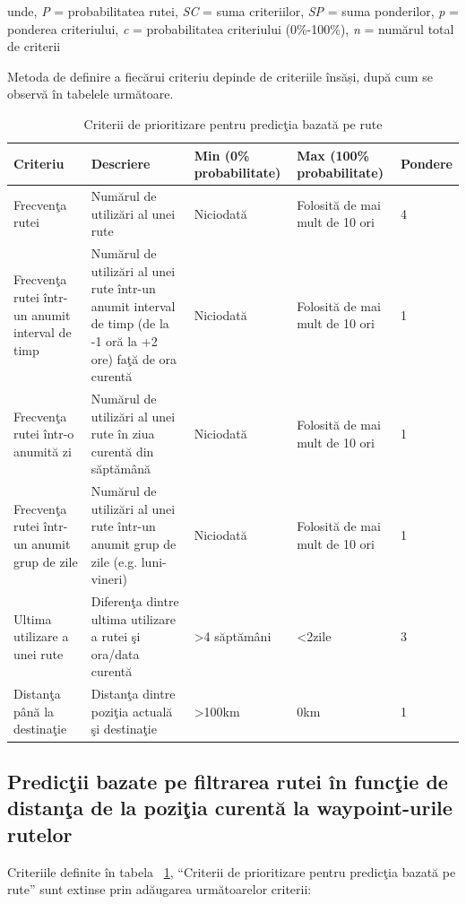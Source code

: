 		unde, \textit{P} = probabilitatea rutei, \textit{SC} = suma criteriilor, \textit{SP} = suma ponderilor, \textit{p} = ponderea criteriului, \textit{c} = probabilitatea criteriului (0\%-100\%), \textit{n} = numărul total de criterii	
		
		\vspace{6pt}
	    Metoda de definire a fiecărui criteriu depinde de criteriile însăși, după cum se observă în tabelele următoare.
		
		\begin{table}[!h]
		\caption{Criterii de prioritizare pentru predicţia bazată pe rute}
		\centering
		\begin{tabular}{ | m{} | m{} | m{3,22cm} | m{} | m{} | }
		\hline
		\textbf{Criteriu} & \textbf{Descriere} & \textbf{Min (0\% probabilitate)} & \textbf{Max (100\% probabilitate)} & \textbf{Pondere} \\ 
		\hline
		 Frecvenţa rutei & Numărul de utilizări al unei rute & Niciodată & Folosită de mai mult de 10 ori & 4 \\
		\hline
		 Frecvenţa rutei într-un anumit interval de timp & Numărul de utilizări al unei rute într-un anumit interval de timp (de la -1 oră la +2 ore) faţă de ora curentă & Niciodată & Folosită de mai mult de 10 ori & 1 \\
		\hline
		 Frecvenţa rutei într-o anumită zi & Numărul de utilizări al unei rute în ziua curentă din săptămână & Niciodată & Folosită de mai mult de 10 ori & 1 \\
		\hline
		 Frecvenţa rutei într-un anumit grup de zile & Numărul de utilizări al unei rute într-un anumit grup de zile (e.g. luni-vineri)& Niciodată &  Folosită de mai mult de 10 ori  & 1 \\
		\hline
		 Ultima utilizare a unei rute & Diferenţa dintre ultima utilizare a rutei şi ora/data curentă & >4 săptămâni & <2zile & 3 \\
		\hline
		 Distanţa până la destinaţie & Distanţa dintre poziţia actuală şi destinaţie & >100km & 0km & 1 \\
		\hline
		\end{tabular}
		\label{table:tabel_predictii}
		\end{table}
		
		
		\subsection{Predicţii bazate pe filtrarea rutei în funcţie de distanţa de la poziţia curentă la waypoint-urile rutelor}
		Criteriile definite în tabela ~\ref{table:tabel_predictii}, ``Criterii de prioritizare pentru predicţia bazată pe rute'' sunt extinse prin adăugarea următoarelor criterii:
		
